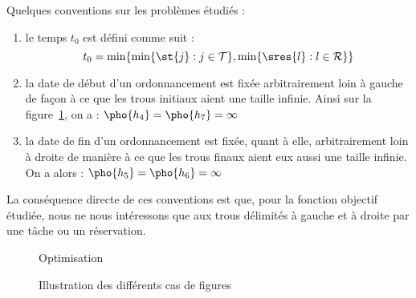 \documentclass[a4paper,11pt]{thesis}
\begin{document}
\begin{nrmq}
    Quelques conventions sur les problèmes étudiés : \begin{enumerate}
        \item le temps $t_0$ est défini comme suit : \[
                t_0 = \min\{\min\{\st{j} : j \in \mathcal{T}\}, \min\{\sres{l} : l \in \mathcal{R}\}\}
            \]
        \item la date de début d'un ordonnancement est fixée arbitrairement loin à gauche de façon à
            ce que les trous initiaux aient une taille infinie. Ainsi sur la figure~\ref{prescas},
            on a : $\pho{h_4} = \pho{h_7} = \infty$
        \item la date de fin d'un ordonnancement est fixée, quant à elle, arbitrairement loin à
            droite de manière à ce que les trous finaux aient eux aussi une taille infinie. On a
            alors : $\pho{h_5} = \pho{h_6} = \infty$
    \end{enumerate}

    La conséquence directe de ces conventions est que, pour la fonction objectif étudiée, nous ne
    nous intéressons que aux trous délimités à gauche et à droite par une tâche ou un réservation.
\end{nrmq}

\begin{figure}
    \begin{center}
        \begin{ordo}[10]{3}{1}{9}
            Optimisation




        \end{ordo}
    \end{center}
    \caption{Illustration des différents cas de figures}
    \label{prescas}
\end{figure}
\end{document}
